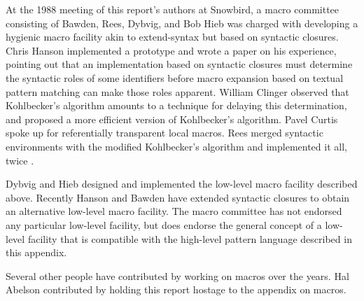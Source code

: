 At the 1988 meeting of this report's authors at Snowbird,
a macro committee consisting of Bawden, Rees, Dybvig,
and Bob Hieb was charged with developing a hygienic macro
facility akin to {\cf extend-syntax} but based on syntactic closures.
Chris Hanson implemented a prototype and wrote a paper on his
experience, pointing out that an implementation based on
syntactic closures must determine the syntactic roles of some
identifiers before macro expansion based on textual pattern
matching can make those roles apparent.  William Clinger
observed that Kohlbecker's algorithm amounts to a technique
for delaying this determination, and proposed a more efficient
version of Kohlbecker's algorithm.  Pavel Curtis spoke up for
referentially transparent local macros.  Rees merged syntactic
environments with the modified Kohlbecker's algorithm and
implemented it all, twice \cite{macrosthatwork}.

Dybvig and Hieb designed and implemented the low-level
macro facility described above.
Recently Hanson and Bawden have extended syntactic closures
to obtain an alternative low-level macro facility.
The macro committee has not endorsed any particular
low-level facility, but does endorse the general concept of
a low-level facility that is compatible with the
high-level pattern language described in this appendix.

Several other people have contributed by working on macros
over the years.  Hal Abelson contributed by holding this
report hostage to the appendix on macros.
